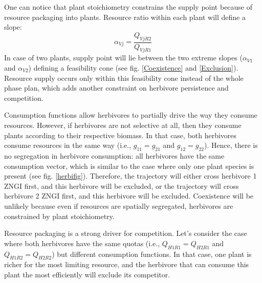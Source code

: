 \documentclass[12pt]{article}
\begin{document}
\par 
One can notice that plant stoichiometry constrains the supply point because of resource packaging into plants. 
Resource ratio within each plant will define a slope:
\begin{equation}
\alpha _{Vj} = \frac{Q_{VjR2}}{Q_{VjR1}}
\end{equation}
In case of two plants, supply point will lie between the two extreme slopes ($\alpha _{V1}$ and $\alpha _{V2}$) defining a feasibility cone (see fig. \ref{Coexistence} and \ref{Exclusion}). Resource supply occurs only within this feasibility cone instead of the whole phase plan, which adds another constraint on herbivore persistence and competition. 
\par
Consumption functions allow herbivores to partially drive the way they consume resources. However, if 
herbivores are not selective at all, then they consume plants according to their respective biomass. In that case, both herbivores consume resources in the same way (i.e., $g_{11}=g_{21}$ and $g_{12}=g_{22}$). Hence, there is no segregation in herbivore consumption: all herbivores have the same consumption vector, which is similar to the case where only one plant species is present (see fig. \ref{herbifig}). Therefore, the trajectory will either cross herbivore 1 ZNGI first, and this herbivore will be excluded, or the trajectory will cross herbivore 2 ZNGI first, and this herbivore will be excluded. %
Coexistence will be unlikely because even if resources are spatially segregated, herbivores are constrained by plant stoichiometry. 
\par
Resource packaging is a strong driver for competition. Let's consider the case where both herbivores have the same quotas (i.e., $Q_{H1R1}=Q_{H2R1}$ and $Q_{H1R2}=Q_{H2R2}$) but different consumption functions. In that case, one plant is richer for the most limiting resource, and %
the herbivore that can consume this plant the most efficiently will exclude its competitor. %
\par
\end{document}
